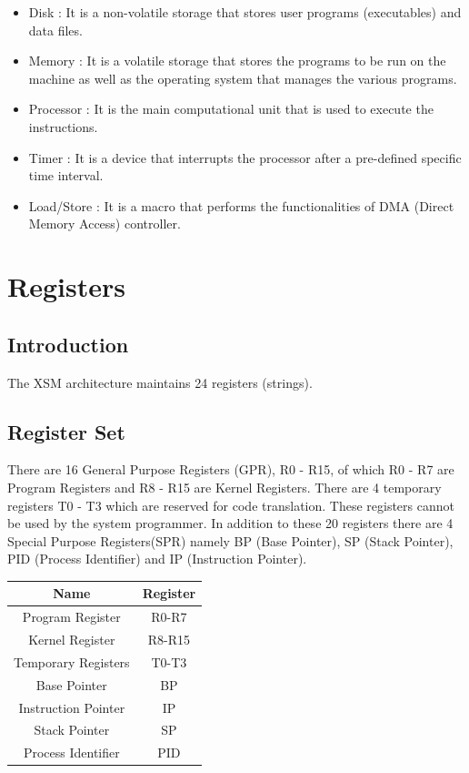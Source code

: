 \documentclass[11pt]{article}
\begin{document}
\begin{itemize}
\item Disk : It is a non-volatile storage that stores user programs (executables) and data files.
\item Memory : It is a volatile storage that stores the programs to be run on the machine as well as the operating system that manages the various programs.
\item Processor : It is the main computational unit that is used to execute the instructions.
\item Timer : It is a device that interrupts the processor after a pre-defined specific time interval.
\item Load/Store : It is a macro that performs the functionalities of DMA (Direct Memory Access) controller.
\end{itemize}






\section{Registers}

\subsection{Introduction}
The XSM architecture maintains 24 registers (strings).

\subsection{Register Set}
There are 16 General Purpose Registers (GPR), R0 - R15, of which R0 - R7 are Program Registers and R8 - R15 are Kernel Registers. There are 4 temporary registers T0 - T3 which are reserved for code translation. These registers cannot be used by the system programmer. In addition to these 20 registers there are 4 Special Purpose Registers(SPR) namely BP (Base Pointer), SP (Stack Pointer), PID (Process Identifier) and IP (Instruction Pointer).


\begin{center}
\begin{tabular}{|c|c|}
\hline Name & Register \\ 
\hline Program Register & R0-R7 \\ 
\hline Kernel Register & R8-R15 \\ 
\hline Temporary Registers & T0-T3 \\ 
\hline Base Pointer & BP \\ 
\hline Instruction Pointer & IP \\ 
\hline Stack Pointer & SP \\ 
\hline Process Identifier & PID \\
\hline
\end{tabular} 
\end{center}
\end{document}
